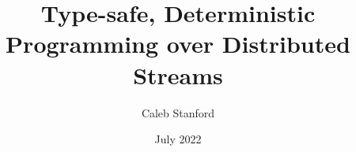 \documentclass{article}
\title{\Large{} Type-safe, Deterministic Programming over Distributed Streams}
\author{Caleb Stanford}
\date{July 2022}
\begin{document}
\maketitle{}



\tableofcontents{}

% 














\renewcommand{\refname}{Other References}


\end{document}
